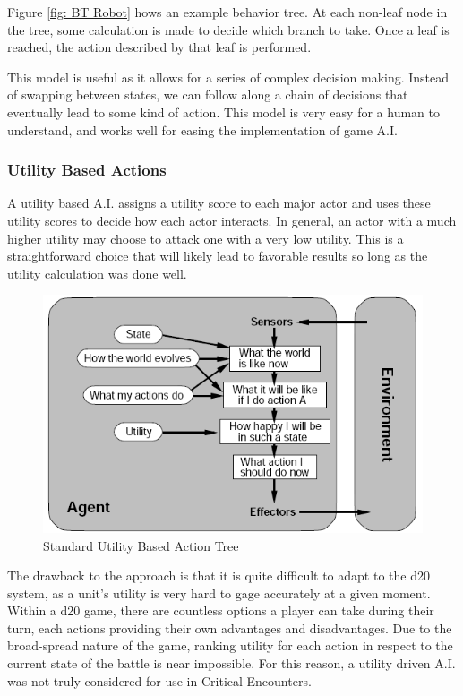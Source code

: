 \documentclass[12pt,a4paper]{report}
\begin{document}
		Figure \ref{fig: BT Robot} hows an example behavior tree. At each non-leaf node in the tree, some calculation is made to decide which branch to take. Once a leaf is reached, the action described by that leaf is performed. 
		
		This model is useful as it allows for a series of complex decision making. Instead of swapping between states, we can follow along a chain of decisions that eventually lead to some kind of action. This model is very easy for a human to understand, and works well for easing the implementation of game A.I. 
		\newpage
		\subsubsection{Utility Based Actions}
		A utility based A.I. assigns a utility score to each major actor and uses these utility scores to decide how each actor interacts. In general, an actor with a much higher utility may choose to attack one with a very low utility. This is a straightforward choice that will likely lead to favorable results so long as the utility calculation was done well. 
		
		\begin{figure}[H]
			\centering
			\includegraphics[scale=.65]{utility}
			\caption{Standard Utility Based Action Tree \cite{softwareagents}}
			\label{fig: Utility Based Actions}
		\end{figure}
		The drawback to the approach is that it is quite difficult to adapt to the d20 system, as a unit's utility is very hard to gage accurately at a given moment. Within a d20 game, there are countless options a player can take during their turn, each actions providing their own advantages and disadvantages. Due to the broad-spread nature of the game, ranking utility for each action in respect to the current state of the battle is near impossible. For this reason, a utility driven A.I. was not truly considered for use in Critical Encounters. 
		\newpage
\end{document}
